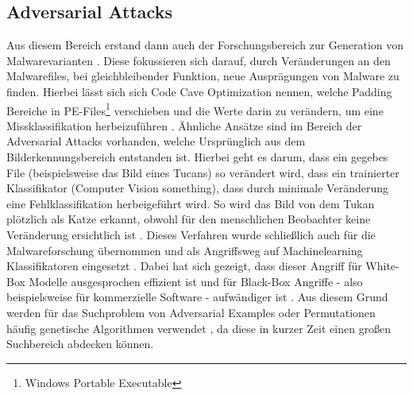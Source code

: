 \subsection{Adversarial Attacks}
Aus diesem Bereich erstand dann auch der Forschungsbereich zur Generation von Malwarevarianten \cite{jin_2023_on}. Diese fokussieren sich darauf, durch Veränderungen an den Malwarefiles, bei gleichbleibender Funktion, neue Ausprägungen von Malware zu finden. Hierbei lässt sich sich Code Cave Optimization nennen, welche Padding Bereiche in PE-Files\footnote{Windows Portable Executable} verschieben und die Werte darin zu verändern, um eine Missklassifikation herbeizuführen \cite{yuste_2022_optimization}. Ähnliche Ansätze sind im Bereich der Adversarial Attacks vorhanden, welche Ursprünglich aus dem Bilderkennungsbereich entstanden ist. Hierbei geht es darum, dass ein gegebes File (beispielsweise das Bild eines Tucans) so verändert wird, dass ein trainierter Klassifikator (Computer Vision something), dass durch minimale Veränderung eine Fehlklassifikation herbeigeführt wird. So wird das Bild von dem Tukan plötzlich als Katze erkannt, obwohl für den menschlichen Beobachter keine Veränderung ersichtlich ist \cite{demetrio_2024_formalizing}. Dieses Verfahren wurde schließlich auch für die Malwareforschung übernommen und als Angriffsweg auf Machinelearning Klassifikatoren eingesetzt \cite{demetrio_2021_functionalitypreserving}. Dabei hat sich gezeigt, dass dieser Angriff für White-Box Modelle ausgesprochen effizient ist und für Black-Box Angriffe - also beispielsweise für kommerzielle Software - aufwändiger ist \cite{yuste_2022_optimization}. Aus diesem Grund werden für das Suchproblem von Adversarial Examples oder Permutationen häufig genetische Algorithmen verwendet \cite{demetrio_2021_functionalitypreserving}, da diese in kurzer Zeit einen großen Suchbereich abdecken können. \label{adversarial_example}
